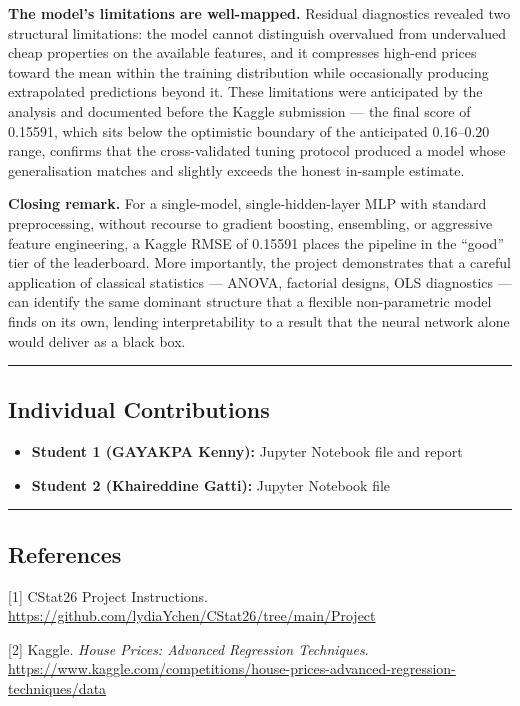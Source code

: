 \textbf{The model's limitations are well-mapped.} Residual diagnostics
revealed two structural limitations: the model cannot distinguish
overvalued from undervalued cheap properties on the available features,
and it compresses high-end prices toward the mean within the training
distribution while occasionally producing extrapolated predictions
beyond it. These limitations were anticipated by the analysis and
documented before the Kaggle submission --- the final score of 0.15591,
which sits below the optimistic boundary of the anticipated 0.16--0.20
range, confirms that the cross-validated tuning protocol produced a
model whose generalisation matches and slightly exceeds the honest
in-sample estimate.

\textbf{Closing remark.} For a single-model, single-hidden-layer MLP
with standard preprocessing, without recourse to gradient boosting,
ensembling, or aggressive feature engineering, a Kaggle RMSE of 0.15591
places the pipeline in the ``good'' tier of the leaderboard. More
importantly, the project demonstrates that a careful application of
classical statistics --- ANOVA, factorial designs, OLS diagnostics ---
can identify the same dominant structure that a flexible non-parametric
model finds on its own, lending interpretability to a result that the
neural network alone would deliver as a black box.

\begin{center}\rule{0.5\linewidth}{0.5pt}\end{center}

\subsection{Individual Contributions}\label{individual-contributions}

\begin{itemize}
\tightlist
\item
  \textbf{Student 1 (GAYAKPA Kenny):} Jupyter Notebook file and report
\item
  \textbf{Student 2 (Khaireddine Gatti):} Jupyter Notebook file
\end{itemize}

\begin{center}\rule{0.5\linewidth}{0.5pt}\end{center}

\subsection{References}\label{references}

{[}1{]} CStat26 Project Instructions.
\url{https://github.com/lydiaYchen/CStat26/tree/main/Project}

{[}2{]} Kaggle. \emph{House Prices: Advanced Regression Techniques}.
\url{https://www.kaggle.com/competitions/house-prices-advanced-regression-techniques/data}
